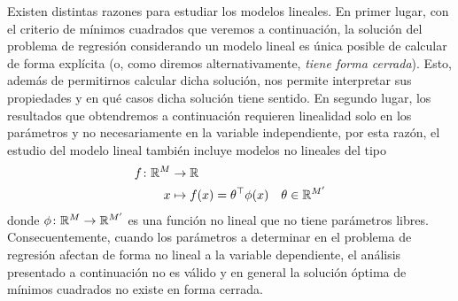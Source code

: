 \begin{mdframed}[style=discusion, frametitle={\center ¿Por qué consideramos el caso lineal en particular?}]

	Existen distintas razones para estudiar los modelos lineales. En primer lugar, con el criterio de mínimos cuadrados que veremos a continuación, la solución del problema de regresión considerando un modelo lineal es única posible de calcular de forma explícita (o, como diremos alternativamente, \emph{tiene forma cerrada}). Esto, además de permitirnos calcular dicha solución, nos permite interpretar sus propiedades y en qué casos dicha solución tiene sentido. En segundo lugar, los resultados que obtendremos a continuación requieren linealidad solo en los parámetros y no necesariamente en la variable independiente, por esta razón, el estudio del modelo lineal también incluye modelos no lineales del tipo
\begin{align}
  f \colon {\mathbb R}^M & \to {\mathbb R}\nonumber\\
  x &\mapsto f(x)=\theta^\top \phi(x) \quad \theta\in{\mathbb R}^{M'}
 \label{eq:reg_no_lin_fn} 
\end{align}
donde $\phi \colon {\mathbb R}^M \to {\mathbb R}^{M'}$ es una función no lineal que no tiene parámetros libres. Consecuentemente, cuando los parámetros a determinar en el problema de regresión afectan de forma no lineal a la variable dependiente, el análisis presentado a continuación no es válido y en general la solución óptima de mínimos cuadrados no existe en forma cerrada. 

\end{mdframed}




